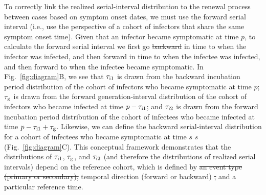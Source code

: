 \documentclass[12pt]{article}
\newcommand{\fref}[1]{Fig.~\ref{fig:#1}}
\newcommand{\psymp}{\ensuremath{p}} %
\newcommand{\ssymp}{\ensuremath{s}} %
\newcommand{\gtime}{\tau_{\rm g}} %
\providecommand{\DIFaddtex}[1]{{\protect\color{blue}\uwave{#1}}} %
\providecommand{\DIFdeltex}[1]{{\protect\color{red}\sout{#1}}}                      %
\providecommand{\DIFaddbegin}{} %
\providecommand{\DIFaddend}{} %
\providecommand{\DIFdelbegin}{} %
\providecommand{\DIFdelend}{} %
\providecommand{\DIFadd}[1]{\texorpdfstring{\DIFaddtex{#1}}{#1}} %
\providecommand{\DIFdel}[1]{\texorpdfstring{\DIFdeltex{#1}}{}} %
\newcommand{\DIFscaledelfig}{0.5}
\newlength{\DIFdelgraphicswidth} %
\newlength{\DIFdelgraphicsheight} %
\newcommand{\DIFaddincludegraphics}[2][]{{\color{blue}\fbox{\DIFOincludegraphics[#1]{#2}}}} %
\newcommand{\DIFdelincludegraphics}[2][]{%
\sbox{\DIFdelgraphicsbox}{\DIFOincludegraphics[#1]{#2}}%
\settoboxwidth{\DIFdelgraphicswidth}{\DIFdelgraphicsbox} %
\settoboxtotalheight{\DIFdelgraphicsheight}{\DIFdelgraphicsbox} %
\scalebox{\DIFscaledelfig}{%
\parbox[b]{\DIFdelgraphicswidth}{\usebox{\DIFdelgraphicsbox}\\[-\baselineskip] \rule{\DIFdelgraphicswidth}{0em}}\llap{\resizebox{\DIFdelgraphicswidth}{\DIFdelgraphicsheight}{%
\setlength{\unitlength}{\DIFdelgraphicswidth}%
\begin{picture}(1,1)%
\thicklines\linethickness{2pt} %
{\color[rgb]{1,0,0}\put(0,0){\framebox(1,1){}}}%
{\color[rgb]{1,0,0}\put(0,0){\line( 1,1){1}}}%
{\color[rgb]{1,0,0}\put(0,1){\line(1,-1){1}}}%
\end{picture}%
}\hspace*{3pt}}} %
} %
\DeclareRobustCommand{\DIFaddbegin}{\DIFOaddbegin \let\includegraphics\DIFaddincludegraphics} %
\DeclareRobustCommand{\DIFaddend}{\DIFOaddend \let\includegraphics\DIFOincludegraphics} %
\DeclareRobustCommand{\DIFdelbegin}{\DIFOdelbegin \let\includegraphics\DIFdelincludegraphics} %
\DeclareRobustCommand{\DIFdelend}{\DIFOaddend \let\includegraphics\DIFOincludegraphics} %
\begin{document}
To correctly link the realized serial-interval distribution to the renewal process
between cases based on symptom onset dates, we must use the forward
serial interval (i.e., use the perspective of a cohort of infectors
that share the same symptom onset time).  Given that an infector
became symptomatic at time $\psymp$, to calculate the forward serial
interval we first go \DIFdelbegin \DIFdel{backward }\DIFdelend \DIFaddbegin \emph{\DIFadd{backward}} \DIFaddend in time to when the infector was
infected, and then forward in time to when the infectee was infected,
and then forward \DIFaddbegin \DIFadd{again }\DIFaddend to when the infectee became symptomatic.
In \fref{diagram}B, we see that $\tau_{\rm i1}$ is drawn from
the backward incubation period distribution of the cohort
of infectors who became symptomatic at time $\psymp$; $\gtime$ is drawn from
the forward generation-interval distribution of the cohort of
infectors who became infected at time $\psymp - \tau_{\rm i1}$; and $\tau_{\rm i2}$
is drawn from the forward incubation period distribution of the cohort of
infectees who became infected at time $\psymp - \tau_{\rm i1} + \gtime$.
Likewise, we can define the backward serial-interval distribution for
a cohort of infectees who became symptomatic at time \DIFdelbegin \DIFdel{$\ssymp$
}\DIFdelend \DIFaddbegin \ssymp
\DIFaddend (\fref{diagram}C).  
This conceptual framework demonstrates that the distributions of $\tau_{\rm i1}$, $\gtime$, and $\tau_{\rm i2}$ (and therefore the distributions of realized serial intervals) depend on the reference cohort, which is defined by \DIFdelbegin \DIFdel{an event type (primary or secondary),
}\DIFdelend temporal direction (forward or backward) \DIFdelbegin \DIFdel{, }\DIFdelend and a particular reference time.
\end{document}
